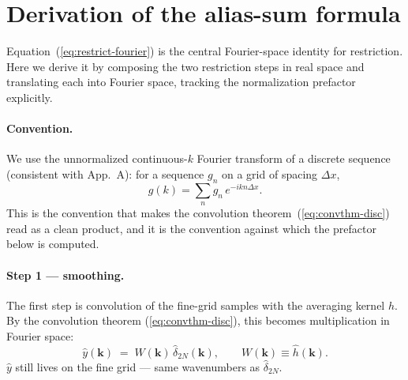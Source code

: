 \documentclass[12pt]{article}
\begin{document}
\section{Derivation of the alias-sum formula}\label{app:aliassum}

Equation~(\ref{eq:restrict-fourier}) is the central Fourier-space
identity for restriction. Here we derive it by composing the two
restriction steps in real space and translating each into Fourier
space, tracking the normalization prefactor explicitly.

\paragraph{Convention.}
We use the unnormalized continuous-$k$ Fourier transform of a discrete
sequence (consistent with App.~A): for a sequence $g_n$ on a grid of
spacing $\Delta x$,
\begin{equation}
  \hat g(k) = \sum_n g_n\,e^{-ikn\Delta x}.
\end{equation}
This is the convention that makes the convolution
theorem~(\ref{eq:convthm-disc}) read as a clean product, and it is the
convention against which the prefactor below is computed.

\paragraph{Step 1 --- smoothing.}
The first step is convolution of the fine-grid samples with the
averaging kernel $h$. By the convolution theorem
(\ref{eq:convthm-disc}), this becomes multiplication in Fourier space:
\begin{equation}\label{eq:app-smooth}
  \hat y(\mathbf k) \;=\; W(\mathbf k)\,\hat\delta_{2N}(\mathbf k),
  \qquad W(\mathbf k) \equiv \hat h(\mathbf k).
\end{equation}
$\hat y$ still lives on the fine grid --- same wavenumbers as
$\hat\delta_{2N}$.
\end{document}
